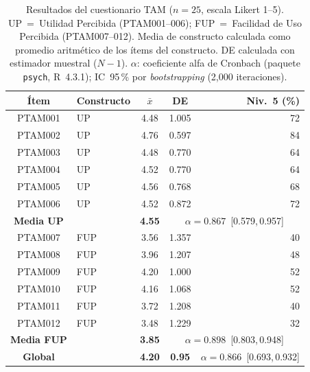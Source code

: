 \documentclass[journal]{IEEEtran}
\begin{document}
	\begin{table}[!t]
		\caption{Resultados del cuestionario TAM ($n=25$, escala Likert 1--5). UP~=~Utilidad Percibida (PTAM001--006); FUP~=~Facilidad de Uso Percibida (PTAM007--012). Media de constructo calculada como promedio aritm\'etico de los \'items del constructo. DE calculada con estimador muestral ($N-1$). $\alpha$: coeficiente alfa de Cronbach (paquete \texttt{psych}, R~4.3.1); IC~95\,\% por \textit{bootstrapping} (2{,}000 iteraciones).}
		\label{tab:tam}
		\centering
		\renewcommand{\arraystretch}{1.25}
		\begin{tabular}{clccr}
			\toprule
			\textbf{\'Item} & \textbf{Constructo} & \textbf{$\bar{x}$} & \textbf{DE} & \textbf{Niv.~5 (\%)} \\
			\midrule
			PTAM001 & UP & 4.48 & 1.005 & 72 \\
			PTAM002 & UP & 4.76 & 0.597 & 84 \\
			PTAM003 & UP & 4.48 & 0.770 & 64 \\
			PTAM004 & UP & 4.52 & 0.770 & 64 \\
			PTAM005 & UP & 4.56 & 0.768 & 68 \\
			PTAM006 & UP & 4.52 & 0.872 & 72 \\
			\midrule
			\textbf{Media UP} & & \textbf{4.55} & \multicolumn{2}{c}{$\alpha=0.867$~[0.579,\,0.957]} \\
			\midrule
			PTAM007 & FUP & 3.56 & 1.357 & 40 \\
			PTAM008 & FUP & 3.96 & 1.207 & 48 \\
			PTAM009 & FUP & 4.20 & 1.000 & 52 \\
			PTAM010 & FUP & 4.16 & 1.068 & 52 \\
			PTAM011 & FUP & 3.72 & 1.208 & 40 \\
			PTAM012 & FUP & 3.48 & 1.229 & 32 \\
			\midrule
			\textbf{Media FUP} & & \textbf{3.85} & \multicolumn{2}{c}{$\alpha=0.898$~[0.803,\,0.948]} \\
			\midrule
			\textbf{Global} & & \textbf{4.20} & \textbf{0.95} & $\alpha=0.866$~[0.693,\,0.932] \\
			\bottomrule
		\end{tabular}
	\end{table}
	
\end{document}
